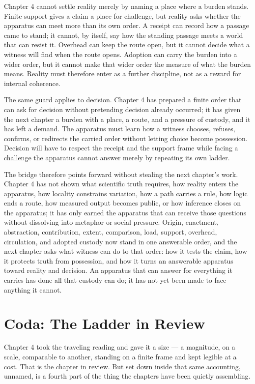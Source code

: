Chapter 4 cannot settle reality merely by naming a place where a burden stands. Finite support gives a claim a place for challenge, but reality asks whether the apparatus can meet more than its own order. A receipt can record how a passage came to stand; it cannot, by itself, say how the standing passage meets a world that can resist it. Overhead can keep the route open, but it cannot decide what a witness will find when the route opens. Adoption can carry the burden into a wider order, but it cannot make that wider order the measure of what the burden means. Reality must therefore enter as a further discipline, not as a reward for internal coherence.

The same guard applies to decision. Chapter 4 has prepared a finite order that can ask for decision without pretending decision already occurred; it has given the next chapter a burden with a place, a route, and a pressure of custody, and it has left a demand. The apparatus must learn how a witness chooses, refuses, confirms, or redirects the carried order without letting choice become possession. Decision will have to respect the receipt and the support frame while facing a challenge the apparatus cannot answer merely by repeating its own ladder.

The bridge therefore points forward without stealing the next chapter's work. Chapter 4 has not shown what scientific truth requires, how reality enters the apparatus, how locality constrains variation, how a path carries a rule, how logic ends a route, how measured output becomes public, or how inference closes on the apparatus; it has only earned the apparatus that can receive those questions without dissolving into metaphor or social pressure. Origin, enactment, abstraction, contribution, extent, comparison, load, support, overhead, circulation, and adopted custody now stand in one answerable order, and the next chapter asks what witness can do to that order: how it tests the claim, how it protects truth from possession, and how it turns an answerable apparatus toward reality and decision. An apparatus that can answer for everything it carries has done all that custody can do; it has not yet been made to face anything it cannot.

\section*{Coda: The Ladder in Review}

Chapter 4 took the traveling reading and gave it a size --- a magnitude, on a scale, comparable to another, standing on a finite frame and kept legible at a cost. That is the chapter in review. But set down inside that same accounting, unnamed, is a fourth part of the thing the chapters have been quietly assembling.


